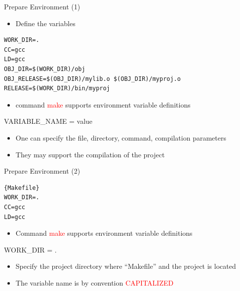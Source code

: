 \begin{frame}[fragile]{Prepare Environment (1)}
\begin{itemize}
	\item {Define the variables}
\end{itemize}
\lstset{language=[gnu] make}
\begin{lstlisting}[linewidth=0.9\linewidth, xleftmargin=0.05\linewidth]
WORK_DIR=.
CC=gcc
LD=gcc
OBJ_DIR=$(WORK_DIR)/obj
OBJ_RELEASE=$(OBJ_DIR)/mylib.o $(OBJ_DIR)/myproj.o
RELEASE=$(WORK_DIR)/bin/myproj
\end{lstlisting}

\begin{itemize}
	\item {command \textcolor{red}{make} supports environment variable definitions }
\end{itemize}
\begin{center}
	\Large{VARIABLE\_NAME = value}
\end{center}
\begin{itemize}
	\item {One can specify the file, directory, command, compilation parameters}
	\item {They may support the compilation of the project}
\end{itemize}
\end{frame}


\begin{frame}[fragile]{Prepare Environment (2)}
\begin{lstlisting}[linewidth=0.9\linewidth, xleftmargin=0.05\linewidth]{Makefile}
WORK_DIR=.
CC=gcc
LD=gcc
\end{lstlisting}
\vspace{-0.2in}
\begin{itemize}
	\item {Command \textcolor{red}{make} supports environment variable definitions }
\end{itemize}
\begin{center}
	\Large{WORK\_DIR = .}
\end{center}
\begin{itemize}
	\item {Specify the project directory where ``Makefile'' and the project is located}
	\item {The  variable name is by convention \textcolor{red}{CAPITALIZED}}
\end{itemize}
\end{frame}

